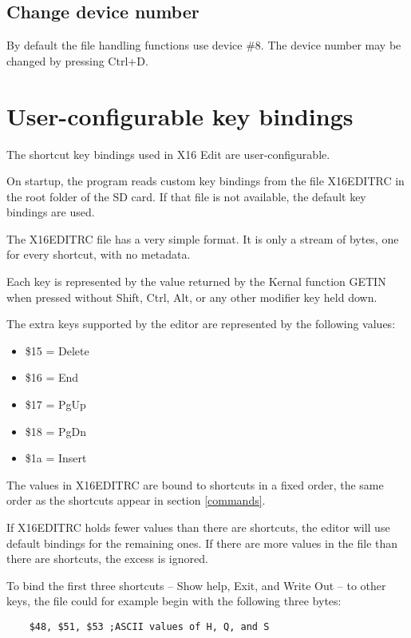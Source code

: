 \documentclass{article}
\begin{document}
    \subsection{Change device number}

    By default the file handling functions use device \#8. The device
    number may be changed by pressing Ctrl+D.

\section{User-configurable key bindings}
\label{keybindings}

The shortcut key bindings used in X16 Edit are user-configurable.

On startup, the program reads custom key bindings from the file X16EDITRC in the
root folder of the SD card. If that file is not available, the default key bindings are
used.

The X16EDITRC file has a very simple format. It is only a stream of bytes, one for every
shortcut, with no metadata.

Each key is represented by the value returned by the Kernal function GETIN when pressed
without Shift, Ctrl, Alt, or any other modifier key held down.

The extra keys supported by the editor are represented by the following values:

\begin{itemize}
    \item \$15 = Delete
    \item \$16 = End
    \item \$17 = PgUp
    \item \$18 = PgDn
    \item \$1a = Insert 
\end{itemize}

The values in X16EDITRC are bound to shortcuts in a fixed order, the same order as
the shortcuts appear in section \ref{commands}.

If X16EDITRC holds fewer values than there are shortcuts, the editor will use
default bindings for the remaining ones. If there are more values in the file than there
are shortcuts, the excess is ignored.

To bind the first three shortcuts -- Show help, Exit, and Write Out -- to other keys,
the file could for example begin with the following three bytes:

\begin{verbatim}
    $48, $51, $53 ;ASCII values of H, Q, and S
\end{verbatim}
\end{document}
